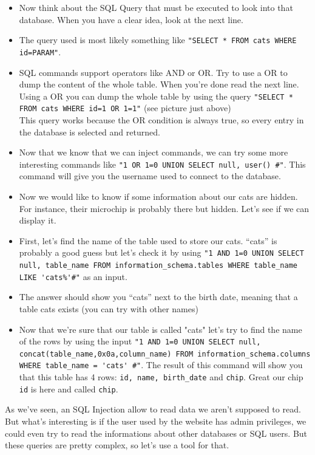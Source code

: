 \documentclass{article}
\begin{document}
\begin{itemize}
    \item Now think about the SQL Query that must be executed to look into that database. When you have a clear idea, look at the next line.
    \item The query used is most likely something like \lstinline{"SELECT * FROM cats WHERE id=PARAM"}.
    \item SQL commands support operators like AND or OR. Try to use a OR to dump the content of the whole table. When you’re done read the next line. Using a OR you can dump the whole table by using the query \lstinline{"SELECT * FROM cats WHERE id=1 OR 1=1"} (see picture just above)\\
    This query works because the OR condition is always true, so every entry in the database is selected and returned.
    \item Now that we know that we can inject commands, we can try some more interesting commands like \lstinline{"1 OR 1=0 UNION SELECT null, user() #"}. This command will give you the username used to connect to the database.
    \item Now we would like to know if some information about our cats are hidden. For instance, their microchip is probably there but hidden. Let’s see if we can display it.
    \item First, let’s find the name of the table used to store our cats. “cats” is probably a good guess but let’s check it by using 
    \lstinline{"1 AND 1=0 UNION SELECT null, table_name FROM information_schema.tables WHERE table_name LIKE 'cats%'#"} as an input.
    \item The answer should show you “cats” next to the birth date, meaning that a table cats exists (you can try with other names)
    \item Now that we’re sure that our table is called "cats" let’s try to find the name of the rows by using the input \lstinline{"1 AND 1=0 UNION SELECT null, concat(table_name,0x0a,column_name) FROM information_schema.columns WHERE table_name = 'cats' #"}. The result of this command will show you that this table has 4 rows: \lstinline{id, name, birth_date} and \lstinline{chip}. Great our chip \lstinline{id} is here and called \lstinline{chip}.
\end{itemize}
As we’ve seen, an SQL Injection allow to read data we aren’t supposed to read. But what’s interesting is if the user used by the website has admin privileges, we could even try to read the informations about other databases or SQL users. But these queries are pretty complex, so let’s use a tool for that.\\
\end{document}
